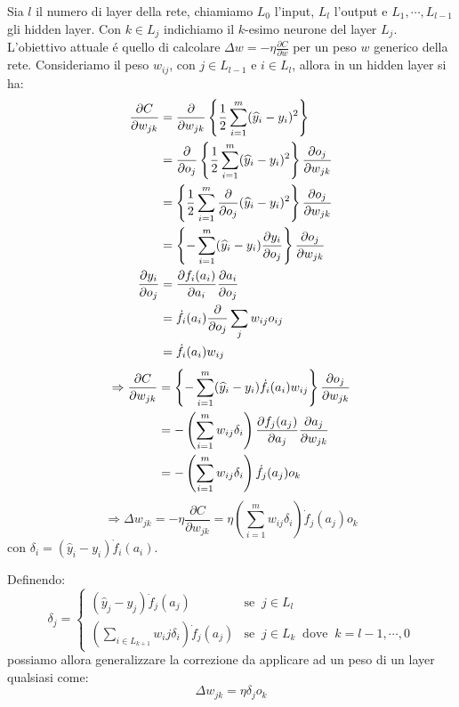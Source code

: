 \documentclass[a4paper,12pt]{report}
\begin{document}
 Sia $l$ il numero di layer della rete, chiamiamo $L_0$ l'input, $L_l$ l'output e $L_1, \cdots, L_{l-1}$ gli hidden layer. 
 Con $k \in L_j$ indichiamo il $k$-esimo neurone del layer $L_j$.
 L'obiettivo attuale \'e quello di calcolare $\Delta w = - \eta \frac{\partial C}{\partial w}$ per un peso $w$ generico della rete. 
 Consideriamo il peso $w_{ij}$, con $j \in L_{l-1}$ e $i \in L_l$, allora in un hidden layer si ha:
 \begin{align}
  \frac{\partial C}{\partial w_{jk}} &= \frac{\partial}{\partial w_{jk}} \left \{ \frac{1}{2} \sum_{i=1}^m (\widehat{y}_i -y_i)^2 \right \} \\
  &= \frac{\partial}{\partial o_j} \left \{ \frac{1}{2} \sum_{i=1}^m (\widehat{y}_i - y_i)^2 \right \} \frac{\partial o_j}{\partial w_{jk}} \notag \\
  &= \left \{ \frac{1}{2} \sum_{i=1}^m \frac{\partial}{\partial o_j} (\widehat{y}_i - y_i)^2 \right \} \frac{\partial o_j}{\partial w_{jk}} \notag \\
  &= \left \{ - \sum_{i=1}^m (\widehat{y}_i - y_i) \frac{\partial y_i}{\partial o_j} \right \} \frac{\partial o_j}{\partial w_{jk}} \notag \\
  \frac{\partial y_i}{\partial o_j} &= \frac{\partial f_i(a_i)}{\partial a_i} \frac{\partial a_i}{\partial o_j} \\
  &= \dot{f}_i(a_i) \frac{\partial}{\partial o_j} \sum_j w_{ij} o_{ij} \notag \\
  &= \dot{f}_i(a_i) w_{ij} \notag
 \end{align}
 \begin{align}
  \Rightarrow \frac{\partial C}{\partial w_{jk}} &= \left \{ - \sum_{i=1}^m (\widehat{y}_i - y_i) \dot{f}_i(a_i) w_{ij} \right \} \frac{\partial o_j}{\partial w_{jk}} \\
  &= - \left( \sum_{i=1}^m w_{ij} \delta_i \right) \frac{\partial f_j(a_j)}{\partial a_j} \frac{\partial a_j}{\partial w_{jk}} \notag \\
  &= - \left( \sum_{i=1}^m w_{ij} \delta_i \right) \dot{f}_j(a_j) o_k \notag
 \end{align}
 \begin{equation}
  \Rightarrow \Delta w_{jk} = - \eta \frac{\partial C}{\partial w_{jk}} = \eta \left(\sum_{i=1}^m w_{ij} \delta_i \right) \dot{f}_j(a_j) o_k
 \end{equation}
 con $\delta_i = (\widehat{y}_i - y_i) \dot{f}_i(a_i)$.
 
 Definendo:
 \begin{equation}
  \delta_j = \begin{cases}
                       (\widehat{y}_j - y_j) \dot{f}_j(a_j) & \mbox{se} \;\; j \in L_l \\
                       \left( \sum_{i \in L_{k+1}} w_ij \delta_i \right) \dot{f}_j(a_j) & \mbox{se} \;\; j \in L_k \;\; \mbox{dove} \;\; k = l-1,\cdots,0
                      \end{cases}
 \end{equation}
 possiamo allora generalizzare la correzione da applicare ad un peso di un layer qualsiasi come:
 \begin{equation}
  \Delta w_{jk} = \eta \delta_j o_k
 \end{equation}
 
\end{document}
